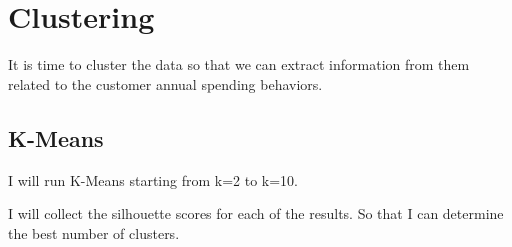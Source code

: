 \documentclass[11pt]{article}
\begin{document}
    \hypertarget{clustering}{%
\section{Clustering}\label{clustering}}

    It is time to cluster the data so that we can extract information from
them related to the customer annual spending behaviors.

    \hypertarget{k-means}{%
\subsection{K-Means}\label{k-means}}

    I will run K-Means starting from k=2 to k=10.

I will collect the silhouette scores for each of the results. So that I
can determine the best number of clusters.
\end{document}
